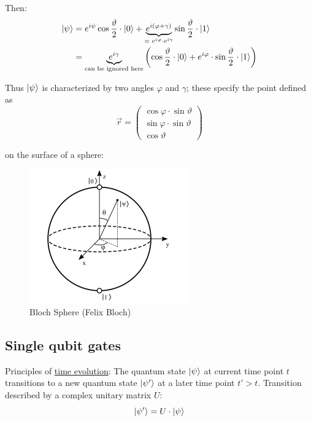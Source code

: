 Then:
\begin{align}
    \lvert\psi\rangle &= 
        e^{i \psi} \cos{\frac{\vartheta}{2}} \cdot \lvert0\rangle 
        + \underbrace{e^{i (\varphi + \gamma)}}_{= \text{ } e^{i\varphi} \cdot e^{i\gamma}} \sin{\frac{\vartheta}{2}} \cdot \lvert1\rangle \\
        &= \underbrace{e^{i \gamma}}_{\text{can be ignored here}}
        \left(\cos{\frac{\vartheta}{2}} \cdot \lvert0\rangle + e^{i\varphi} \cdot \sin{\frac{\vartheta}{2}} \cdot \lvert1\rangle\right)
\end{align}

Thus $\lvert\psi\rangle$ is characterized by two angles $\varphi$ and $\gamma$;
these specify the point defined as 
\begin{equation*}
    \vec{r} = \begin{pmatrix}
        \cos{\varphi} \cdot \sin{\vartheta} \\
        \sin{\varphi} \cdot \sin{\vartheta} \\
        \cos{\vartheta}
    \end{pmatrix}
\end{equation*}

on the surface of a sphere:
\begin{figure}[h!]
    \centering
    \includegraphics[scale=0.5]{chapters/res/bloch-sphere.png}
    \caption{Bloch Sphere (Felix Bloch)}
\end{figure}

\subsection{Single qubit gates}

Principles of \underline{time evolution}: The quantum state $\lvert\psi\rangle$ at current
time point $t$ transitions to a new quantum state $\lvert\psi'\rangle$ at a later time point
$t' > t$. \newline
Transition described by a complex unitary matrix $U$:
\begin{equation}
    \lvert\psi'\rangle = U \cdot \lvert\psi\rangle
\end{equation}


